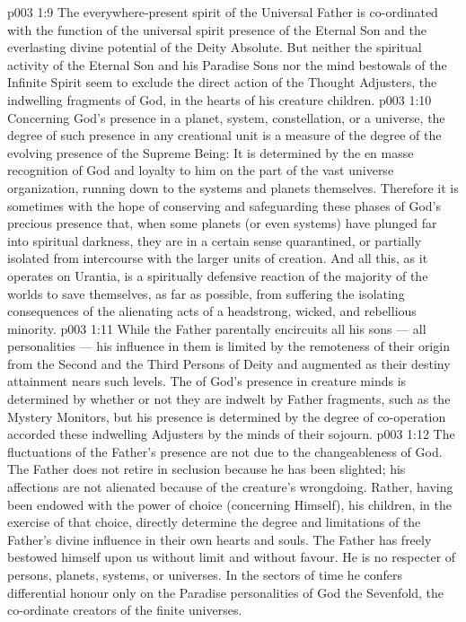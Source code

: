 \vs p003 1:9 The everywhere\hyp{}present spirit of the Universal Father is co\hyp{}ordinated with the function of the universal spirit presence of the Eternal Son and the everlasting divine potential of the Deity Absolute. But neither the spiritual activity of the Eternal Son and his Paradise Sons nor the mind bestowals of the Infinite Spirit seem to exclude the direct action of the Thought Adjusters, the indwelling fragments of God, in the hearts of his creature children.
\vs p003 1:10 Concerning God’s presence in a planet, system, constellation, or a universe, the degree of such presence in any creational unit is a measure of the degree of the evolving presence of the Supreme Being: It is determined by the en masse recognition of God and loyalty to him on the part of the vast universe organization, running down to the systems and planets themselves. Therefore it is sometimes with the hope of conserving and safeguarding these phases of God’s precious presence that, when some planets (or even systems) have plunged far into spiritual darkness, they are in a certain sense quarantined, or partially isolated from intercourse with the larger units of creation. And all this, as it operates on Urantia, is a spiritually defensive reaction of the majority of the worlds to save themselves, as far as possible, from suffering the isolating consequences of the alienating acts of a headstrong, wicked, and rebellious minority.
\vs p003 1:11 \pc While the Father parentally encircuits all his sons --- all personalities --- his influence in them is limited by the remoteness of their origin from the Second and the Third Persons of Deity and augmented as their destiny attainment nears such levels. The  of God’s presence in creature minds is determined by whether or not they are indwelt by Father fragments, such as the Mystery Monitors, but his  presence is determined by the degree of co\hyp{}operation accorded these indwelling Adjusters by the minds of their sojourn.
\vs p003 1:12 The fluctuations of the Father’s presence are not due to the changeableness of God. The Father does not retire in seclusion because he has been slighted; his affections are not alienated because of the creature’s wrongdoing. Rather, having been endowed with the power of choice (concerning Himself), his children, in the exercise of that choice, directly determine the degree and limitations of the Father’s divine influence in their own hearts and souls. The Father has freely bestowed himself upon us without limit and without favour. He is no respecter of persons, planets, systems, or universes. In the sectors of time he confers differential honour only on the Paradise personalities of God the Sevenfold, the co\hyp{}ordinate creators of the finite universes.
